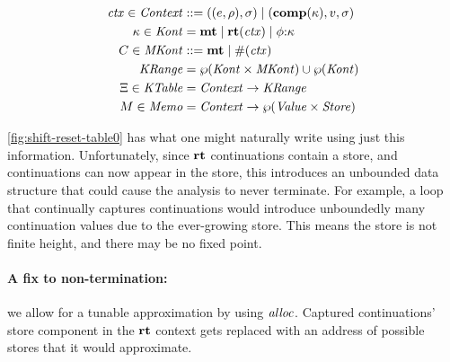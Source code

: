\begin{align*}
  \mathit{ctx} \in \mathit{Context} &::= ((e,\rho),\sigma) \mathrel{\mid} (\mathbf{comp}(\kappa),v,\sigma) \\
  \kappa \in \mathit{Kont} &= \mathbf{mt} \mathrel{\mid} \mathbf{rt}(\mathit{ctx}) \mathrel{\mid} \phi{\tt :} \kappa \\
  C \in \mathit{MKont} &::= \mathbf{mt} \mathrel{\mid} \#(\mathit{ctx}) \\
  \mathit{KRange} &= \wp(\mathit{Kont} \times \mathit{MKont}) \cup \wp(\mathit{Kont}) \\
  \Xi \in \mathit{KTable} &= \mathit{Context} \to \mathit{KRange} \\
  M \in \mathit{Memo} &= \mathit{Context} \to \wp(\mathit{Value} \times \mathit{Store})
\end{align*}

\autoref{fig:shift-reset-table0} has what one might naturally write using just this information.
%
Unfortunately, since $\mathbf{rt}$ continuations contain a store, and continuations can now appear in the store, this introduces an unbounded data structure that could cause the analysis to never terminate.
%
For example, a loop that continually captures continuations would introduce unboundedly many continuation values due to the ever-growing store.
%
This means the store is not finite height, and there may be no fixed point.

\paragraph{A fix to non-termination:} we allow for a tunable approximation by using $\mathit{alloc}$.
%
Captured continuations' store component in the $\mathbf{rt}$ context gets replaced with an address of possible stores that it would approximate.

